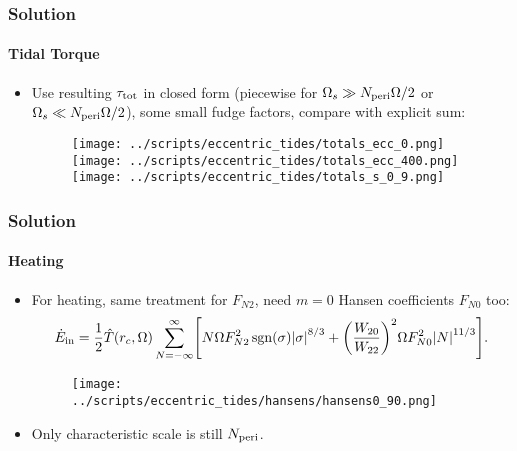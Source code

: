 \documentclass[dvipsnames,8pt]{beamer}
\DeclareMathOperator{\sgn}{sgn}
\DeclarePairedDelimiter\abs{\lvert}{\rvert}
\DeclarePairedDelimiter\p{\lparen}{\rparen}
\DeclarePairedDelimiter\s{\lbrack}{\rbrack}
\begin{document}
\begin{frame}
    \frametitle{Solution}
    \framesubtitle{Tidal Torque}

    \begin{itemize}
        \item Use resulting $\tau_{\rm tot}$ in closed form (piecewise for
            $\Omega_s \gg N_{\rm peri}\Omega / 2$ or $\Omega_s \ll N_{\rm
            peri}\Omega / 2$), some small fudge factors, compare with explicit
            sum:
            \begin{figure}[h]
                \centering
                \texttt{[image: ../scripts/eccentric\_tides/totals\_ecc\_0.png]}
                \texttt{[image: ../scripts/eccentric\_tides/totals\_ecc\_400.png]}
                \texttt{[image: ../scripts/eccentric\_tides/totals\_s\_0\_9.png]}
            \end{figure}
    \end{itemize}
\end{frame}

\begin{frame}
    \frametitle{Solution}
    \framesubtitle{Heating}

    \begin{itemize}
        \item For heating, same treatment for $F_{N2}$, need $m = 0$ Hansen
            coefficients $F_{N0}$ too:
        \begin{align}
             \dot{E}_{\rm in} = \frac{1}{2}\hat{T}\p*{r_c, \Omega}
                 \sum\limits_{N = -\infty}^\infty\s*{
                    N\Omega F_{N2}^2 \sgn \p*{\sigma} \abs*{\sigma}^{8/3}
                    + \p*{\frac{W_{20}}{W_{22}}}^2\Omega F_{N0}^2 \abs*{N}^{11/3}}.
                    \label{eq:e_sum}
        \end{align}
        \begin{figure}[h]
            \centering
            \texttt{[image: ../scripts/eccentric\_tides/hansens/hansens0\_90.png]}
        \end{figure}

        \item Only characteristic scale is still $N_{\rm peri}$.
    \end{itemize}
\end{frame}
\end{document}
